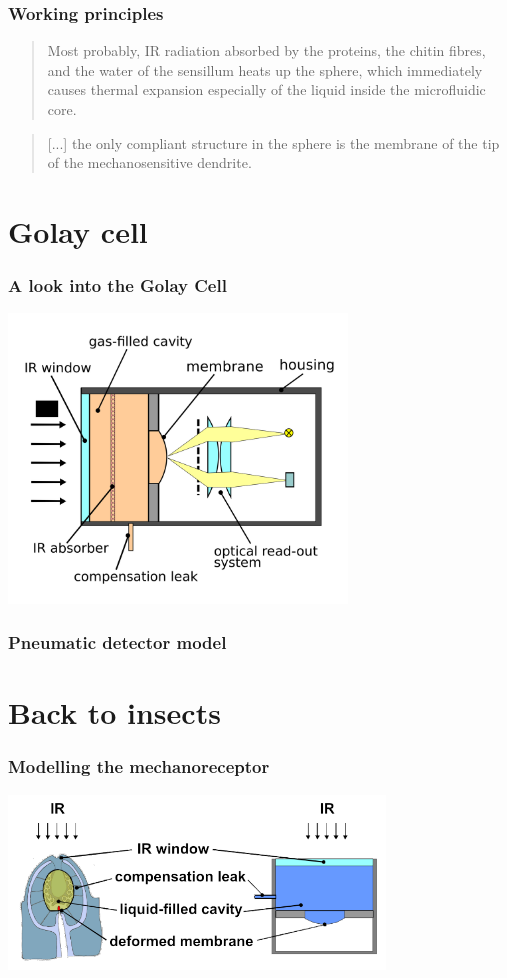 \documentclass[14pt]{beamer}
\begin{document}
\begin{frame}
\frametitle{Working principles}
\begin{quote}
Most probably, IR radiation absorbed by the proteins, the chitin fibres, and the water of the sensillum heats up the sphere, which immediately causes \alert{thermal expansion} especially of the liquid inside the microfluidic core.
\end{quote}
\begin{quote}
[...] the only \alert{compliant structure} in the sphere is the \alert{membrane} of the tip of the \alert{mechanosensitive dendrite.}
\end{quote}
\end{frame}

\section{Golay cell}
\begin{frame}
\frametitle{A look into the Golay Cell}
\includegraphics[width=9cm]{2000px-Golay_Cell_Schematic.png}
\end{frame}

\begin{frame}
\frametitle{Pneumatic detector model}

\end{frame}

\section{Back to insects}
\begin{frame}
\frametitle{Modelling the mechanoreceptor}
\includegraphics[width=10cm]{themodel.png}
\end{frame}
\end{document}
